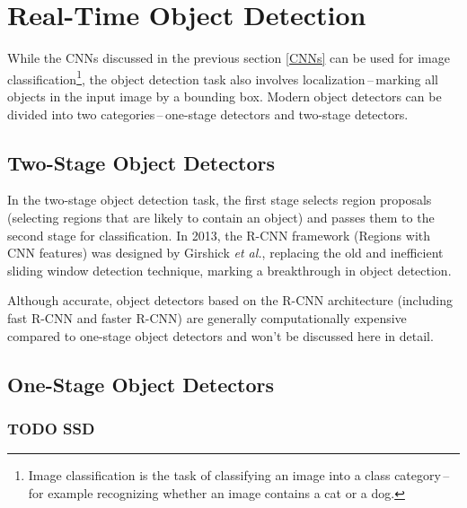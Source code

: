 
\section{Real-Time Object Detection}

While the CNNs discussed in the previous section \autoref{CNNs} can be used for
image classification\footnote{Image classification is the task of classifying an
image into a class category\,--\,for example recognizing whether an image
contains a cat or a dog.}, the object detection task also involves
localization\,--\,marking all objects in the input image by a bounding box.
Modern object detectors can be divided into two categories\,--\,one-stage
detectors and two-stage detectors. 



\subsection{Two-Stage Object Detectors}

In the two-stage object detection task, the first stage selects region proposals
(selecting regions that are likely to contain an object) and passes them to the
second stage for classification. In 2013, the R-CNN framework
\cite{Girshick2013} (Regions with CNN features) was designed by Girshick
\textit{et al.}, replacing the old and inefficient sliding window detection
technique, marking a breakthrough in object detection. \cite{Li2022}

Although accurate, object detectors based on the R-CNN architecture (including
fast R-CNN and faster R-CNN) are generally computationally expensive compared to
one-stage object detectors and won't be discussed here in detail.


\subsection{One-Stage Object Detectors}


\subsubsection{TODO SSD}


